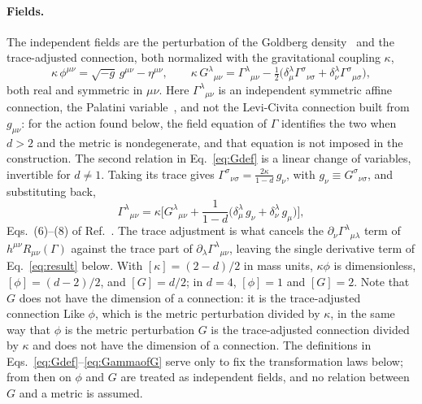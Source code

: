 \documentclass[prd,aps,preprint,superscriptaddress,nofootinbib,amsmath,amssymb,eqsecnum]{revtex4-2}
\providecommand{\DIFaddtex}[1]{{\protect\color{blue} \sf #1}} %
\providecommand{\DIFdeltex}[1]{{\protect\color{red} \scriptsize #1}} %
\providecommand{\DIFaddbegin}{} %
\providecommand{\DIFaddend}{} %
\providecommand{\DIFdelbegin}{} %
\providecommand{\DIFdelend}{} %
\providecommand{\DIFadd}[1]{\texorpdfstring{\DIFaddtex{#1}}{#1}} %
\providecommand{\DIFdel}[1]{\texorpdfstring{\DIFdeltex{#1}}{}} %
\begin{document}
\DIFdelend \paragraph{Fields.} The independent fields are the perturbation of the Goldberg
density~\cite{Goldberg1958} and
the trace-adjusted connection, both normalized with the gravitational coupling $\kappa$,
\begin{equation}
\kappa\,\phi^{\mu\nu}=\sqrt{-g}\,g^{\mu\nu}-\eta^{\mu\nu},\qquad
\kappa\,G^{\lambda}{}_{\mu\nu}=\Gamma^{\lambda}{}_{\mu\nu}
-\tfrac12\big(\delta^{\lambda}_{\mu}\Gamma^{\sigma}{}_{\nu\sigma}
+\delta^{\lambda}_{\nu}\Gamma^{\sigma}{}_{\mu\sigma}\big),
\label{eq:Gdef}
\end{equation}
both real and symmetric in $\mu\nu$. Here $\Gamma^{\lambda}{}_{\mu\nu}$ is an independent
symmetric affine connection, the Palatini variable~\cite{Palatini1919,Ferraris1982}, and not
the Levi-Civita connection built
from $g_{\mu\nu}$: for the action found below, the field equation of $\Gamma$ identifies the
two when $d>2$ and the metric is nondegenerate, and that equation is not imposed in the
construction. The second relation in Eq.~\eqref{eq:Gdef} is a linear change of variables,
invertible for $d\neq1$. Taking its trace
gives $\Gamma^{\sigma}{}_{\nu\sigma}=\frac{2\kappa}{1-d}\,g_\nu$, with
$g_\nu\equiv G^{\sigma}{}_{\nu\sigma}$, and substituting back,
\begin{equation}
\Gamma^{\lambda}{}_{\mu\nu}=\kappa\Big[G^{\lambda}{}_{\mu\nu}
+\frac{1}{1-d}\big(\delta^{\lambda}_{\mu}\,g_\nu+\delta^{\lambda}_{\nu}\,g_\mu\big)\Big],
\label{eq:GammaofG}
\end{equation}
Eqs.~(6)--(8) of Ref.~\cite{BrandtMcKeon2015}. The trace adjustment is what cancels the
$\partial_\nu\Gamma^{\lambda}{}_{\mu\lambda}$ term of $h^{\mu\nu}R_{\mu\nu}(\Gamma)$ against
the trace part of $\partial_\lambda\Gamma^{\lambda}{}_{\mu\nu}$, leaving the single derivative
term of Eq.~\eqref{eq:result} below. \DIFdelbegin \DIFdel{With
$[\kappa]=(2-d)/2$ in mass units, $\kappa\phi$ is dimensionless, $[\phi]=(d-2)/2$, and
$[G]=d/2$; in $d=4$, $[\phi]=1$ and $[G]=2$. Note that $G$ does not have the dimension of a
connection: it is the trace-adjusted connection }\DIFdelend \DIFaddbegin \DIFadd{Like $\phi$, which is the metric perturbation }\DIFaddend divided by
$\kappa$, \DIFdelbegin \DIFdel{in the same way that
$\phi$ is the metric perturbation }\DIFdelend \DIFaddbegin \DIFadd{$G$ is the trace-adjusted connection }\DIFaddend divided by $\kappa$ \DIFaddbegin \DIFadd{and does not have the
dimension of a connection}\DIFaddend . The definitions in
Eqs.~\eqref{eq:Gdef}--\eqref{eq:GammaofG} serve only to fix the transformation laws below;
from then on $\phi$ and $G$ are treated as independent fields, and no relation between $G$ and
a metric is assumed.
\end{document}
